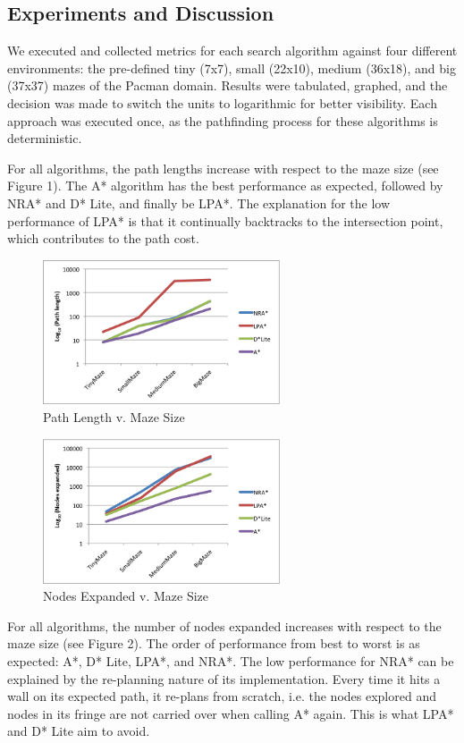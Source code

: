     \subsection{Experiments and Discussion}
    
    We executed and collected metrics for each search algorithm against four different environments: the pre-defined tiny (7x7), small (22x10), medium (36x18), and big (37x37) mazes of the Pacman domain. Results were tabulated, graphed, and the decision was made to switch the units to logarithmic for better visibility. Each approach was executed once, as the pathfinding process for these algorithms is deterministic.
    
    

	For all algorithms, the path lengths increase with respect to the maze size (see Figure 1). The A* algorithm has the best performance as expected, followed by NRA* and D* Lite, and finally be LPA*. The explanation for the low performance of LPA* is that it continually backtracks to the intersection point, which contributes to the path cost.

\begin{figure}[t]
	\centering
	\includegraphics[width=7cm]{PathLength.png}
	\caption{Path Length v. Maze Size}
	\label{fig:1}
\end{figure}

	\begin{figure}[t]
		\centering
		\includegraphics[width=7cm]{NodesExpanded.png}
		\caption{Nodes Expanded v. Maze Size}
		\label{fig:2}
	\end{figure}


	\vspace{-0mm}
	For all algorithms, the number of nodes expanded increases with respect to the maze size (see Figure 2). The order of performance from best to worst is as expected: A*, D* Lite, LPA*, and NRA*. The low performance for NRA* can be explained by the re-planning nature of its implementation. Every time it hits a wall on its expected path, it re-plans from scratch, i.e. the nodes explored and nodes in its fringe are not carried over when calling A* again. This is what LPA* and D* Lite aim to avoid. 

